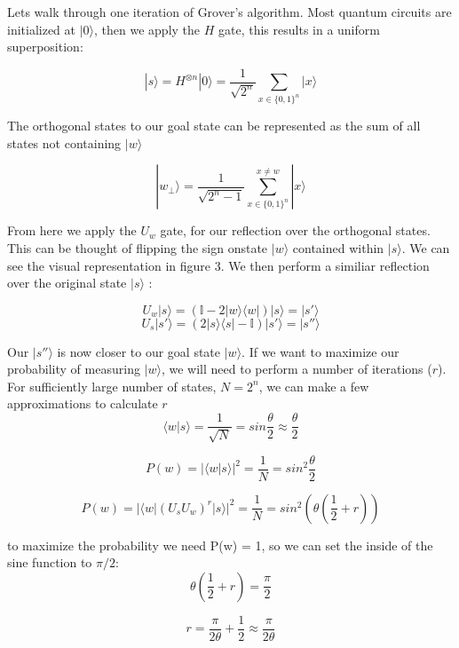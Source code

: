 \documentclass[twocolumn,showpacs,preprintnumbers,amsmath,amssymb]{revtex4}
\begin{document}
		Lets walk through one iteration of Grover's algorithm. Most quantum circuits are initialized at $|0\rangle$, then we apply the $H$ gate, this results in a uniform superposition:
		
		
		$$ |s\rangle = H^{\otimes n} |0 \rangle = \frac{1}{\sqrt{2^n}} \sum_{x\in\{0,1\}^n} |x\rangle$$
		
		
		The orthogonal states  to our goal state can be represented as the sum of all states not containing $|w\rangle$
		
		$$ |w_\perp\rangle=  \frac{1}{\sqrt{2^n -1}} \sum_{x\in\{0,1\}^n}^{x \neq w} |x\rangle$$
		
		From here we apply the $U_w$ gate, for our reflection over the orthogonal states. This can be thought of flipping the sign onstate $|w\rangle$ contained within $|s\rangle$. We can see the visual representation in figure 3. We then perform a similiar reflection over the original state $|s\rangle$ :
		
		$$ U_w|s \rangle	=  (\mathbb {I} - 2|w \rangle \langle w|) |s \rangle = |s'\rangle$$
		$$ U_s|s' \rangle	=  (2|s \rangle \langle s| - \mathbb {I}) |s' \rangle = |s''\rangle$$
		
		Our $|s''\rangle$ is now closer to our goal state $|w\rangle$.  If we want to maximize our probability of measuring  $|w\rangle$, we will need to perform a number of iterations ($r$). For sufficiently large number of states, $N = 2^n$, we can make a few approximations to calculate $r$
		\begin{equation}
			\langle w | s \rangle = \frac{1}{\sqrt{N}} = sin \frac{\theta}{2} \approx \frac{\theta}{2}
		\end{equation}
		
		
		$$P(w) = |\langle w | s \rangle|^2 = \frac{1}{N} = sin^2 \frac{\theta}{2} $$
		
		$$P(w) = |\langle w |(U_sU_w)^r |s \rangle|^2 = \frac{1}{N} = sin^2 (\theta(\frac{1}{2} + r)) $$
		
		to maximize the probability we need P(w) = 1, so we can set the inside of the sine function to $\pi/2$:
		$$ \theta(\frac{1}{2} + r) = \frac{\pi}{2}$$
		
		\begin{equation}
			r = \frac{\pi}{2\theta} + \frac{1}{2} \approx \frac{\pi}{2\theta}
		\end{equation}
		
\end{document}
